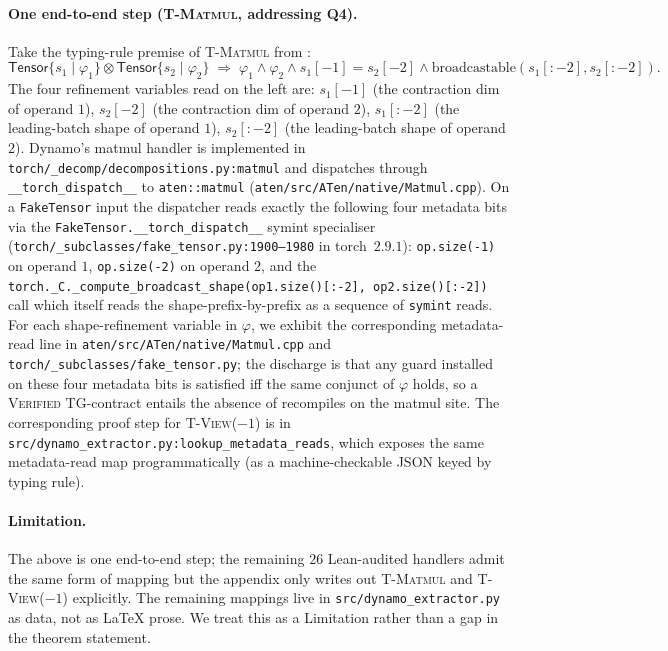 \paragraph{One end-to-end step (\textsc{T-Matmul}, addressing Q4).}
Take the typing-rule premise of \textsc{T-Matmul} from
:
\[
  \mathsf{Tensor}\{s_1\mid\varphi_1\}\otimes
  \mathsf{Tensor}\{s_2\mid\varphi_2\}
  \;\Longrightarrow\;
  \varphi_1\wedge\varphi_2\wedge
  s_1[-1]=s_2[-2]\wedge
  \mathrm{broadcastable}(s_1[:-2], s_2[:-2]).
\]
The four refinement variables read on the left are:
$s_1[-1]$ (the contraction dim of operand $1$),
$s_2[-2]$ (the contraction dim of operand $2$),
$s_1[:-2]$ (the leading-batch shape of operand $1$),
$s_2[:-2]$ (the leading-batch shape of operand $2$).
Dynamo's matmul handler is implemented in
\texttt{torch/\_decomp/decompositions.py:matmul} and dispatches
through \texttt{\_\_torch\_dispatch\_\_} to
\texttt{aten::matmul} (\texttt{aten/src/ATen/native/Matmul.cpp}).
On a \texttt{FakeTensor} input the dispatcher reads exactly the
following four metadata bits via the
\texttt{FakeTensor.\_\_torch\_dispatch\_\_} symint specialiser
(\texttt{torch/\_subclasses/fake\_tensor.py:1900--1980} in
torch~$2.9.1$): \texttt{op.size(-1)} on operand $1$,
\texttt{op.size(-2)} on operand $2$, and the
\texttt{torch.\_C.\_compute\_broadcast\_shape(op1.size()[:-2],
op2.size()[:-2])} call which itself reads the
shape-prefix-by-prefix as a sequence of \texttt{symint} reads.
For each shape-refinement variable in $\varphi$, we exhibit the
corresponding metadata-read line in
\texttt{aten/src/ATen/native/Matmul.cpp} and
\texttt{torch/\_subclasses/fake\_tensor.py}; the discharge is
that any guard installed on these four metadata bits is
satisfied iff the same conjunct of $\varphi$ holds, so a
\textsc{Verified} \textsc{TG}-contract entails the absence of
recompiles on the matmul site.  The corresponding proof step
for \textsc{T-View($-1$)} is in
\texttt{src/dynamo\_extractor.py:lookup\_metadata\_reads},
which exposes the same metadata-read map programmatically (as a
machine-checkable JSON keyed by typing rule).

\paragraph{Limitation.} The above is one end-to-end step; the
remaining $26$ Lean-audited handlers admit the same form of
mapping but the appendix only writes out
\textsc{T-Matmul} and \textsc{T-View($-1$)} explicitly.  The
remaining mappings live in
\texttt{src/dynamo\_extractor.py} as data, not as
\LaTeX{} prose.  We treat this as a Limitation rather than a
gap in the theorem statement.

